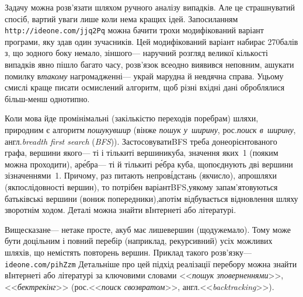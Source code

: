 \Tutorial	Задачу можна розв'язати шляхом ручного аналізу випадків. Але це страшнуватий спосіб, вартий уваги лише коли нема кращих ідей. За\nolinebreak[2] посиланням \verb"http://ideone.com/jjq2Pq" можна бачити трохи модифікований варіант програми, яку здав один з\nolinebreak[3] учасників. Цей модифікований варіант набирає 270\nolinebreak[3] балів з, що з\nolinebreak[3] одного боку немало, з\nolinebreak[3] іншого\nolinebreak[3] --- на\nolinebreak[3] ручний розгляд великої кількості випадків явно пішло багато часу, розв'язок все\nolinebreak[2] одно виявився не\nolinebreak[3] повним, а\nolinebreak[3] шукати помилку в\nolinebreak[3] \emph{такому} нагромадженні\nolinebreak[3] --- украй марудна й невдячна справа. У\nolinebreak[3] цьому смислі краще писати осмислений алгоритм, щоб різні вхідні дані оброблялися більш-менш однотипно.

{


Коли мова йде про\nolinebreak[3] мінімальні (за\nolinebreak[3] кількістю переходів по\nolinebreak[3] ребрам) шляхи, природним є алгоритм \emph{пошуку\nolinebreak[3] вшир} (він\nolinebreak[3] же \emph{пошук у~ширину}, рос.\nolinebreak[3] \emph{поиск в~ширину}, англ.\nolinebreak[3] \emph{breadth first search} (\emph{BFS})). Застосовувати\nolinebreak[2] BFS треба до\nolinebreak[3] неорієн\-то\-ваного графа, вершини якого\nolinebreak[3] --- ті і тільки\nolinebreak[3] ті вершини\nolinebreak[1] куба, значення яких~1 (по\nolinebreak[3] яким можна проходити), а\nolinebreak[3] р\'{е}бра\nolinebreak[3] --- ті й тільки\nolinebreak[3] ті р\'{е}бра куба, що\nolinebreak[3] поєднують дві вершини зі\nolinebreak[3] значеннями~1. Причому, раз питають не\nolinebreak[3] про\nolinebreak[1] в\'{і}д\-стань (як\nolinebreak[3] число), а\nolinebreak[3] про\nolinebreak[1] шляхи (як\nolinebreak[3] послідовності вершин), то потрібен варіант\nolinebreak[2] BFS,\linebreak[1] у\nolinebreak[3] якому запам'ятовуються батьківські вершини (вони\nolinebreak[3] ж попередники),\linebreak[1] а\nolinebreak[3] потім відбувається відновлення шляху зворотнім ходом. Деталі можна знайти в\nolinebreak[3] Інтернеті або літературі.

}

Вищесказане\nolinebreak[3] --- не\nolinebreak[3] таке просте, а\nolinebreak[3] куб має лише\nolinebreak[3] вершин (що\nolinebreak[3] дуже\nolinebreak[1] мало). Тому може бути доцільним і повний перебір (наприклад, рекурсивний) усіх можливих шляхів, що не\nolinebreak[3] містять повторень вершин. Приклад такого розв'язку\nolinebreak[3] --- \verb"ideone.com/pihZzm"\hspace{0.5em plus 1em} Детальніше про цей підхід реалізації перебору можна знайти в\nolinebreak[3] Інтернеті або літературі за ключовими словами <<\emph{пошук з\nolinebreak[3] поверненнями}>>, <<\emph{бектрекінг}>> (рос.\nolinebreak[3] <<\emph{поиск с\nolinebreak[3] возвратом}>>, англ.\nolinebreak[3] <<\emph{backtracking}>>).

